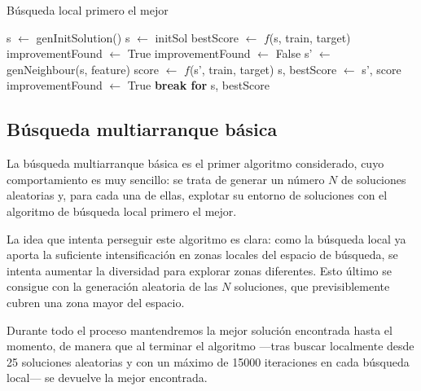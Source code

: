 \documentclass[a4paper, 11pt, titlepage]{article}
\begin{document}
    \begin{algorithm}
        \caption{Búsqueda local primero el mejor}\label{primMejor}
        \begin{algorithmic}
                \State s $\gets$ genInitSolution()
            \Else
                \State s $\gets$ initSol
            \EndIf
            \State bestScore $\gets$ $f$(s, train, target)
            \State improvementFound $\gets$ True
                \State improvementFound $\gets$ False
                 
                    \State s' $\gets$ genNeighbour(s, feature)
                    \State score $\gets$ $f$(s', train, target)
                        \State s, bestScore $\gets$ s', score
                        \State improvementFound $\gets$ True
                        \State \textbf{break for}
                    \EndIf
                \EndFor
            \EndWhile
            \State \Return s, bestScore
        \end{algorithmic}
    \end{algorithm}

    \subsection{Búsqueda multiarranque básica}

    La búsqueda multiarranque básica es el primer algoritmo considerado, cuyo comportamiento es muy sencillo: se trata de generar un número $N$ de soluciones aleatorias y, para cada una de ellas, explotar su entorno de soluciones con el algoritmo de búsqueda local primero el mejor.

    La idea que intenta perseguir este algoritmo es clara: como la búsqueda local ya aporta la suficiente intensificación en zonas locales del espacio de búsqueda, se intenta aumentar la diversidad para explorar zonas diferentes. Esto último se consigue con la generación aleatoria de las $N$ soluciones, que previsiblemente cubren una zona mayor del espacio.

    Durante todo el proceso mantendremos la mejor solución encontrada hasta el momento, de manera que al terminar el algoritmo ---tras buscar localmente desde 25 soluciones aleatorias y con un máximo de 15000 iteraciones en cada búsqueda local--- se devuelve la mejor encontrada.
\end{document}
